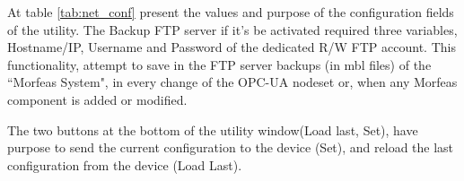 At table \ref{tab:net_conf} present the values and purpose of the configuration fields of the utility.
The Backup FTP server if it's be activated required three variables, Hostname/IP,
Username and Password of the dedicated R/W FTP account.
This functionality, attempt to save in the FTP server backups (in mbl files) of the ``Morfeas System",
in every change of the OPC-UA nodeset or, when any Morfeas component is added or modified.

\par
The two buttons at the bottom of the utility window(Load last, Set),
have purpose to send the current configuration to the device (Set),
and reload the last configuration from the device (Load Last).